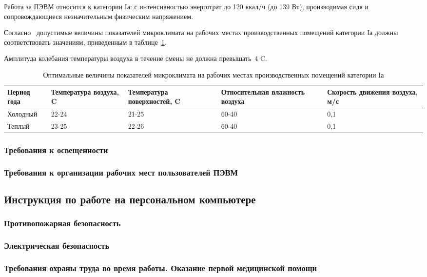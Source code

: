  Работа за ПЭВМ относится к категории Iа: с интенсивностью энерготрат до 120 ккал/ч (до 139 Вт), 
 производимая сидя и сопровождающиеся незначительным физическим напряжением.~\cite{sanpin_mikroclimate} 
 
 Согласно~\cite{sanpin_mikroclimate} допустимые величины показателей микроклимата на рабочих местах производственных помещений категории Iа 
 должны соответствовать значениям, приведенным в таблице~\ref{tab:climate_1}. 
 
 Амплитуда колебания температуры воздуха в течение смены не должна превышать~4\textdegree{} C.
 
\begin{table}[h!]
\caption{ Оптимальные величины показателей микроклимата на рабочих местах производственных помещений категории Iа }
\label{tab:climate_1}
\begin{center}
\begin{tabularx}{\linewidth}{|X|X|X|X|X|}
\hline
Период года & Температура воздуха, \textdegree{}C & Температура поверхностей, \textdegree{}C & Относительная влажность воздуха & Скорость движения воздуха, м/с\\
\hline
Холодный & 22-24 & 21-25 & 60-40 & 0,1\\
\hline
Теплый & 23-25 & 22-26 & 60-40 & 0,1\\
\hline
\end{tabularx}
\end{center}
\end{table}





\subsubsection{Требования к освещенности}

\subsubsection{Требования к организации рабочих мест пользователей ПЭВМ}


\subsection{Инструкция по работе на персональном компьютере}

\subsubsection{Противопожарная безопасность}

\subsubsection{Электрическая безопасность}

\subsubsection{Требования охраны труда во время работы. Оказание первой медицинской помощи}